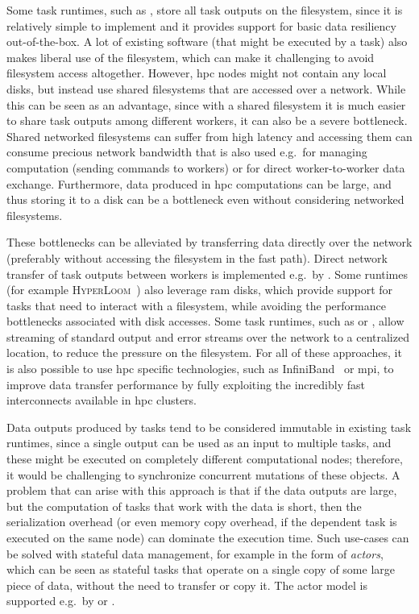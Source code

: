 Some task runtimes, such as \snakemake{}, store all task outputs on the filesystem,
since it is relatively simple to implement and it provides support for basic data resiliency
out-of-the-box. A lot of existing software (that might be executed by a task) also makes liberal
use of the filesystem, which can make it challenging to avoid filesystem access altogether.
However, \gls{hpc} nodes might not contain any local disks, but instead use shared
filesystems that are accessed over a network. While this can be seen as an advantage, since with a
shared filesystem it is much easier to share task outputs among different workers, it can also be a
severe bottleneck. Shared networked filesystems can suffer from high latency and accessing them can
consume precious network bandwidth that is also used e.g.\ for managing computation (sending
commands to workers) or for direct worker-to-worker data exchange. Furthermore, data produced in
\gls{hpc} computations can be large, and thus storing it to a disk can be a
bottleneck even without considering networked filesystems.

These bottlenecks can be alleviated by transferring data directly over the network (preferably
without accessing the filesystem in the fast path). Direct network transfer of task outputs between
workers is implemented e.g.\ by \dask{}. Some runtimes (for example
\textsc{HyperLoom}~\cite{hyperloom}) also leverage \gls{ram} disks, which
provide support for tasks that need to interact with a filesystem, while avoiding the performance
bottlenecks associated with disk accesses. Some task runtimes, such as \hypershell{} or
\pegasus{}, allow streaming of standard output and error streams over the network to a
centralized location, to reduce the pressure on the filesystem. For all of these approaches, it is
also possible to use \gls{hpc} specific technologies, such as
InfiniBand~\cite{infiniband} or \gls{mpi}, to improve data transfer performance
by fully exploiting the incredibly fast interconnects available in \gls{hpc}
clusters.

Data outputs produced by tasks tend to be considered immutable in existing task runtimes, since a
single output can be used as an input to multiple tasks, and these might be executed on completely
different computational nodes; therefore, it would be challenging to synchronize concurrent
mutations of these objects. A problem that can arise with this approach is that if the data outputs
are large, but the computation of tasks that work with the data is short, then the serialization
overhead (or even memory copy overhead, if the dependent task is executed on the same node) can
dominate the execution time. Such use-cases can be solved with stateful data management, for
example in the form of \emph{actors}, which can be seen as stateful tasks that operate on
a single copy of some large piece of data, without the need to transfer or copy it. The actor model
is supported e.g.\ by \dask{} or \ray{}.

